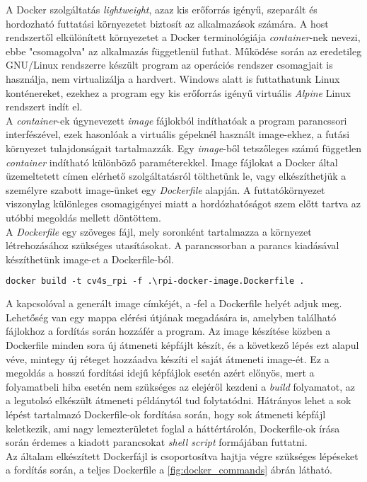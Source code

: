 A Docker szolgáltatás \emph{lightweight}, azaz kis erőforrás igényű, szeparált és hordozható futtatási környezetet biztosít az alkalmazások számára. A host rendszertől elkülönített környezetet a Docker terminológiája \emph{container}-nek nevezi, ebbe "csomagolva" az alkalmazás függetlenül futhat. Működése során az eredetileg GNU/Linux rendszerre készült program az operációs rendszer csomagjait is használja, nem virtualizálja a hardvert. Windows alatt is futtathatunk Linux konténereket, ezekhez a program egy kis erőforrás igényű virtuális \emph{Alpine} Linux rendszert indít el. 
\\
 A \emph{container}-ek úgynevezett \emph{image} fájlokból indíthatóak a program parancssori interfészével, ezek hasonlóak a virtuális gépeknél használt image-ekhez, a futási környezet tulajdonságait tartalmazzák. Egy \emph{image}-ből tetszőleges számú független \emph{container} indítható különböző paraméterekkel. Image fájlokat a Docker által üzemeltetett  címen elérhető szolgáltatásról tölthetünk le, vagy elkészíthetjük a személyre szabott image-ünket egy \emph{Dockerfile} alapján. A futtatókörnyezet viszonylag különleges csomagigényei miatt a hordózhatóságot szem előtt tartva az utóbbi megoldás mellett döntöttem.\\
A \emph{Dockerfile} egy szöveges fájl, mely soronként tartalmazza a környezet létrehozásához szükséges utasításokat. A parancssorban a  parancs kiadásával készíthetünk image-et a Dockerfile-ból. \cite{docker-doc}

\begin{mdframed}[backgroundcolor=gray!20]
\begin{small}
\begin{lstlisting}[language=XML]
docker build -t cv4s_rpi -f .\rpi-docker-image.Dockerfile .
\end{lstlisting}
\end{small}
\end{mdframed}

A  kapcsolóval a generált image címkéjét, a -fel a Dockerfile helyét adjuk meg. Lehetőség van egy mappa elérési útjának megadására is, amelyben található fájlokhoz a fordítás során hozzáfér a program. Az image készítése közben a Dockerfile minden sora új átmeneti képfájlt készít, és a következő lépés ezt alapul véve, mintegy új réteget hozzáadva készíti el saját átmeneti image-ét. Ez a megoldás a hosszú fordítási idejű képfájlok esetén azért előnyös, mert a folyamatbeli hiba esetén nem szükséges az elejéről kezdeni a \emph{build} folyamatot, az a legutolsó elkészült átmeneti példánytól tud folytatódni. Hátrányos lehet a sok lépést tartalmazó Dockerfile-ok fordítása során, hogy sok átmeneti képfájl keletkezik, ami nagy lemezterületet foglal a háttértárolón, Dockerfile-ok írása során érdemes a kiadott parancsokat \emph{shell script} formájában futtatni. \cite{docker-doc}\\
Az általam elkészített Dockerfájl is csoportosítva hajtja végre szükséges lépéseket a fordítás során, a teljes Dockerfile  a \ref{fig:docker_commands} ábrán látható.

